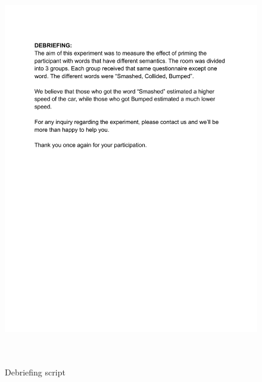 \documentclass[11pt]{article}
\begin{document}
\begin{figure}[H]
  \caption{ ~\\Debriefing script} 
  \centering 
  \includegraphics[width=\textwidth]{Debriefing.pdf}
~\label{fig:debriefing}
\end{figure} 
\end{document}
